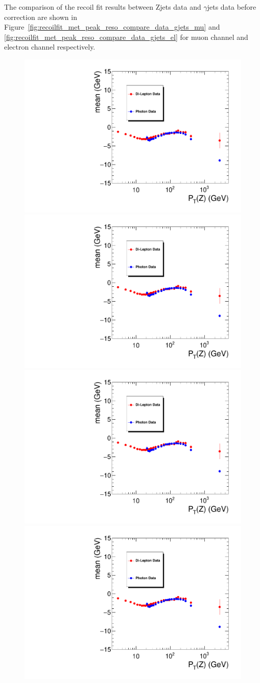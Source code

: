 \vspace{0.3cm}
The comparison of the recoil fit results between Zjets data and $\gamma$jets data before correction are shown in 
Figure~\ref{fig:recoilfit_met_peak_reso_compare_data_gjets_mu}
and \ref{fig:recoilfit_met_peak_reso_compare_data_gjets_el}
for muon channel and electron channel respectively. 

\begin{figure}[htbp]
\begin{center}
\includegraphics[width=0.46\linewidth, page=1]{figures/plots_SingleEMU_Run2016Full_03Feb2017_allcorV2_met_para_study_ZSelecLowLPt_mu_VS_SinglePhoton_Run2016Full_03Feb2017_allcorV2_NoRecoil_met_para_study_ZSelecLowLPt_mu.pdf}
\includegraphics[width=0.46\linewidth, page=5]{figures/plots_SingleEMU_Run2016Full_03Feb2017_allcorV2_met_para_study_ZSelecLowLPt_mu_VS_SinglePhoton_Run2016Full_03Feb2017_allcorV2_NoRecoil_met_para_study_ZSelecLowLPt_mu.pdf}
\includegraphics[width=0.46\linewidth, page=3]{figures/plots_SingleEMU_Run2016Full_03Feb2017_allcorV2_met_para_study_ZSelecLowLPt_mu_VS_SinglePhoton_Run2016Full_03Feb2017_allcorV2_NoRecoil_met_para_study_ZSelecLowLPt_mu.pdf}
\includegraphics[width=0.46\linewidth, page=7]{figures/plots_SingleEMU_Run2016Full_03Feb2017_allcorV2_met_para_study_ZSelecLowLPt_mu_VS_SinglePhoton_Run2016Full_03Feb2017_allcorV2_NoRecoil_met_para_study_ZSelecLowLPt_mu.pdf}

\end{center}
\end{figure}
